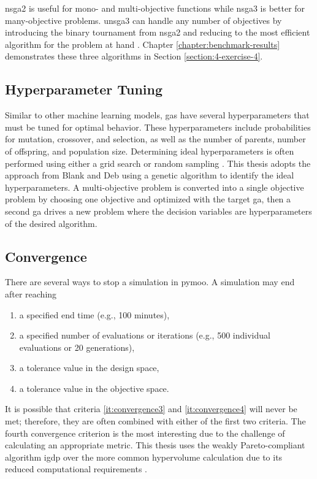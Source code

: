 \ac{nsga2} is useful for mono- and multi-objective functions while \ac{nsga3} is
better for many-objective problems. \ac{unsga3} can handle any number of
objectives by introducing the binary tournament from \ac{nsga2} and reducing to
the most efficient algorithm for the problem at hand \cite{seada_unified_2016}.
Chapter \ref{chapter:benchmark-results} demonstrates these three algorithms in 
Section \ref{section:4-exercise-4}.

\subsection{Hyperparameter Tuning}
Similar to other machine learning models, \acp{ga} have several hyperparameters
that must be tuned for optimal behavior. These hyperparameters include
probabilities for mutation, crossover, and selection, as well as the number of
parents, number of offspring, and population size. Determining ideal
hyperparameters is often performed using either a grid search or random sampling
\cite{bergstra_random_2012}. This thesis adopts the approach from Blank and Deb
\cite{blank_pymoo_2020} using a genetic algorithm to identify the ideal
hyperparameters. A multi-objective problem is converted into a single objective problem 
by choosing one objective and optimized with the target \ac{ga}, then a second \ac{ga} 
drives a new problem where the decision variables are hyperparameters of the desired algorithm.

\subsection{Convergence}
There are several ways to stop a simulation in \ac{pymoo}. A simulation may end
after reaching
\begin{enumerate}
    \item a specified end time (e.g., 100 minutes),
    \label{it:convergence1}
    \item a specified number of evaluations or iterations (e.g., 500 individual
    evaluations or 20 generations),
    \label{it:convergence2}
    \item a tolerance value in the design space,
    \label{it:convergence3}    
    \item a tolerance value in the objective space.
    \label{it:convergence4}
\end{enumerate}

It is possible that criteria \ref{it:convergence3} and \ref{it:convergence4}
will never be met; therefore, they are often combined with either of the first
two criteria. The fourth convergence criterion is the most interesting due to
the challenge of calculating an appropriate metric. This thesis uses the weakly
Pareto-compliant algorithm \ac{igdp} over the more common hypervolume
calculation due to its reduced computational requirements
\cite{ishibuchi_modified_2015}.

